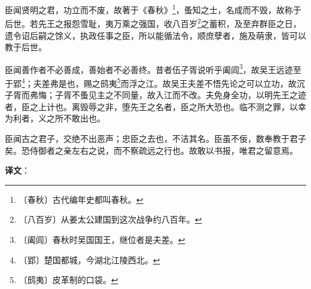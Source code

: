 \documentclass[12pt,UTF-8,openany]{ctexbook}
\begin{document}
\begin{normalsize}
    臣闻贤明之君，功立而不废，故著于《春秋》\footnote{〔春秋〕古代编年史都叫春秋。}，蚤知之士，名成而不毁，故称于后世。若先王之报怨雪耻，夷万乘之强国，收八百岁\footnote{〔八百岁〕从姜太公建国到这次战争约八百年。}之蓄积，及至弃群臣之日，遗令诏后嗣之馀义，执政任事之臣，所以能循法令，顺庶孽者，施及萌隶，皆可以教于后世。
    
    臣闻善作者不必善成，善始者不必善终。昔者伍子胥说听乎阖闾\footnote{〔阖闾〕春秋时吴国国王，继位者是夫差。}，故吴王远迹至于郢\footnote{〔郢〕楚国都城，今湖北江陵西北。}；夫差弗是也，赐之鸱夷\footnote{〔鸱夷〕皮革制的口袋。}而浮之江。故吴王夫差不悟先论之可以立功，故沉子胥而弗悔；子胥不蚤见主之不同量，故入江而不改。夫免身全功，以明先王之迹者，臣之上计也。离毁辱之非，堕先王之名者，臣之所大恐也。临不测之罪，以幸为利者，义之所不敢出也。
    
    臣闻古之君子，交绝不出恶声；忠臣之去也，不洁其名。臣虽不佞，数奉教于君子矣。恐侍御者之亲左右之说，而不察疏远之行也。故敢以书报，唯君之留意焉。
\end{normalsize}


\newpage

\textbf{译文}：

\vspace{1em}
\end{document}
